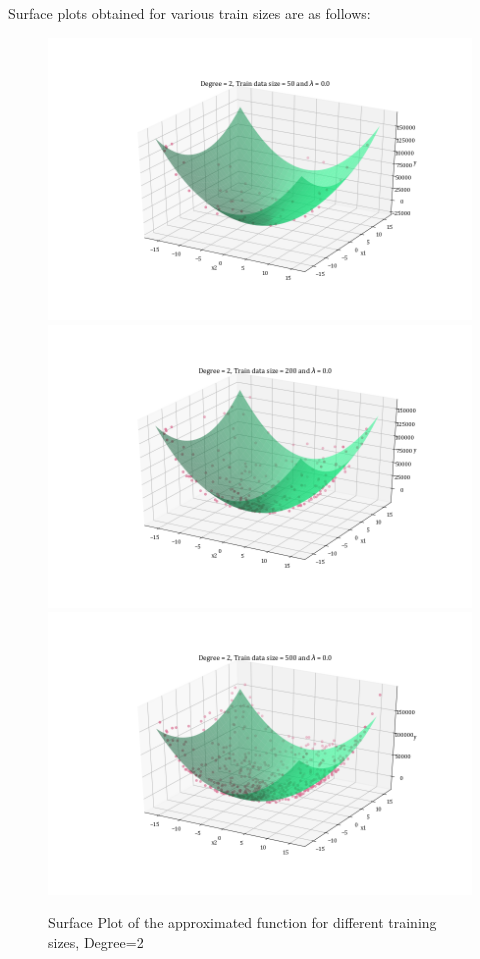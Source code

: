 \documentclass[12pt,a4paper]{article}
\begin{document}
Surface plots obtained for various train sizes are as follows: 
\begin{figure}[H]
    \centering
    \includegraphics[scale=0.35]{images/D=2,T=50,l=0.0.png}
    \includegraphics[scale=0.35]{images/D=2,T=200,l=0.0.png}
    \includegraphics[scale=0.35]{images/D=2,T=500,l=0.0.png}
    \caption{Surface Plot of the approximated function for different training sizes, Degree=2}
    \label{fig:sp_d2}
\end{figure}
\end{document}
